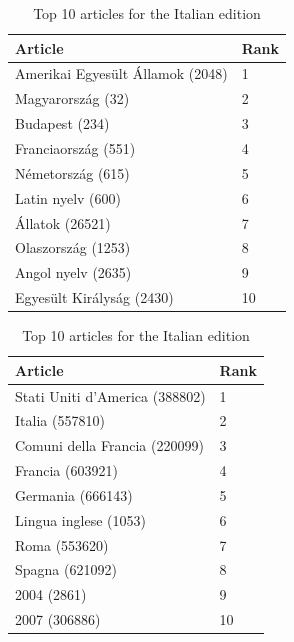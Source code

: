 \begin{table}[htbp]
    \begin{minipage}{.45\linewidth}
        \centering
        \begin{tabular}{ll}
            \toprule
            Article & Rank\\
            \midrule
            Amerikai Egyesült Államok (2048) & 1\\
            Magyarország (32) & 2\\
            Budapest (234) & 3\\
            Franciaország (551) & 4\\
            Németország (615) & 5\\
            Latin nyelv (600) & 6\\
            Állatok (26521) & 7\\
            Olaszország (1253) & 8\\
            Angol nyelv (2635) & 9\\
            Egyesült Királyság (2430) & 10\\
            \bottomrule
        \end{tabular}
        \caption{Top 10 articles for the Hungarian edition}
    \end{minipage}
    \hfill
    \begin{minipage}{.45\linewidth}
        \centering
        \begin{tabular}{ll}
            \toprule
            Article & Rank\\
            \midrule
            Stati Uniti d'America (388802) & 1\\
            Italia (557810) & 2\\
            Comuni della Francia (220099) & 3\\
            Francia (603921) & 4\\
            Germania (666143) & 5\\
            Lingua inglese (1053) & 6\\
            Roma (553620) & 7\\
            Spagna (621092) & 8\\
            2004 (2861) & 9\\
            2007 (306886) & 10\\
            \bottomrule
        \end{tabular}
        \caption{Top 10 articles for the Italian edition}
    \end{minipage}
\end{table}
